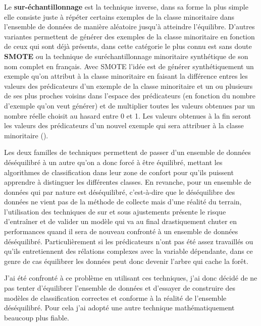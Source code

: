 Le \textbf{sur-échantillonnage} est la technique inverse, dans sa forme la plus simple elle consiste juste à répéter certains exemples de la classe minoritaire dans l'ensemble de données de manière aléatoire jusqu'à atteindre l'équilibre. D'autres variantes permettent de générer des exemples de la classe minoritaire en fonction de ceux qui sont déjà présents, dans cette catégorie le plus connu est sans doute \textbf{SMOTE} ou la technique de suréchantillonnage minoritaire synthétique de son nom complet en français. Avec SMOTE l'idée est de générer synthétiquement un exemple qu'on attribut à la classe minoritaire en faisant la différence entres les valeurs des prédicateurs d'un exemple de la classe minoritaire et un ou plusieurs de ses plus proches voisins dans l'espace des prédicateurs (en fonction du nombre d'exemple qu'on veut générer) et de multiplier toutes les valeurs obtenues par un nombre réelle choisit au hasard entre 0 et 1. Les valeurs obtenues à la fin seront les valeurs des prédicateurs d'un nouvel exemple qui sera attribuer à la classe minoritaire (\cite{chawla2002smote}).

Les deux familles de techniques permettent de passer d'un ensemble de données déséquilibré à un autre qu'on a donc forcé à être équilibré, mettant les algorithmes de classification dans leur zone de confort pour qu'ils puissent apprendre à distinguer les différentes classes. En revanche, pour un ensemble de données qui par nature est déséquilibré, c'est-à-dire que le déséquilibre des données ne vient pas de la méthode de collecte mais d'une réalité du terrain, l'utilisation des techniques de sur et sous ajustements présente le risque d'entraîner et de valider un modèle qui va au final drastiquement chuter en performances quand il sera de nouveau confronté à un ensemble de données déséquilibré. Particulièrement si les prédicateurs n'ont pas été assez travaillés ou qu'ils entretiennent des rélations complexes avec la variable dépendante, dans ce genre de cas équilibrer les données peut donc devenir l'arbre qui cache la forêt.

J'ai été confronté à ce problème en utilisant ces techniques, j'ai donc décidé de ne pas tenter d'équilibrer l'ensemble de données et d'essayer de construire des modèles de classification correctes et conforme à la réalité de l'ensemble déséquilibré. Pour cela j'ai adopté une autre technique mathématiquement beaucoup plus fiable.

